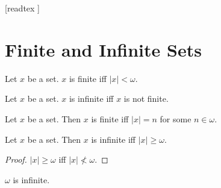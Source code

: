 \documentclass[10pt]{article}
\begin{document}
  \begin{imports}
    \begin{forthel}
      [readtex ]
    \end{forthel}
  \end{imports}


  \section*{Finite and Infinite Sets}

  \begin{forthel}
    \begin{definition}[id=SET_THEORY_07_5346658235711488,printid]
      Let $x$ be a set.
      $x$ is finite iff $|x| < \omega$.
    \end{definition}
  \end{forthel}

  \begin{forthel}
    \begin{definition}[id=SET_THEORY_07_8295412068777984,printid]
      Let $x$ be a set.
      $x$ is infinite iff $x$ is not finite.
    \end{definition}
  \end{forthel}

  \begin{forthel}
    \begin{proposition}[id=SET_THEORY_07_3806229474312192,printid]
      Let $x$ be a set.
      Then $x$ is finite iff $|x| = n$ for some $n \in \omega$.
    \end{proposition}
  \end{forthel}

  \begin{forthel}
    \begin{proposition}[id=SET_THEORY_07_3174577070931968,printid]
      Let $x$ be a set.
      Then $x$ is infinite iff $|x| \geq \omega$.
    \end{proposition}
    \begin{proof}
      $|x| \geq \omega$ iff $|x| \nless \omega$.
    \end{proof}
  \end{forthel}

  \begin{forthel}
    \begin{proposition}[id=SET_THEORY_07_9154385075632368,printid]
      $\omega$ is infinite.
    \end{proposition}
  \end{forthel}
\end{document}
